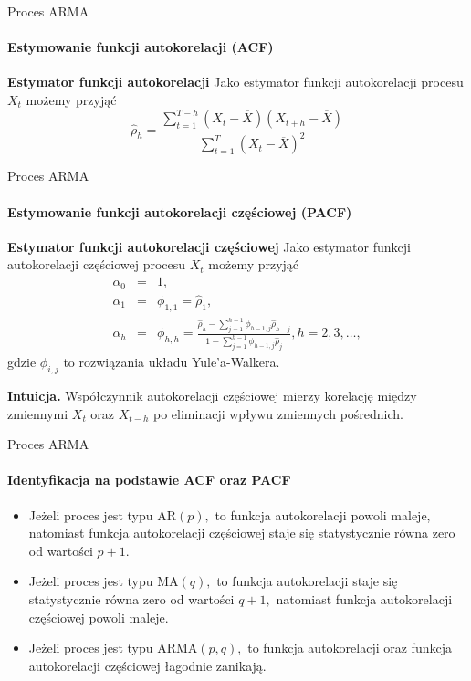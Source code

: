 \documentclass[a4paper, 11pt]{beamer}
\begin{document}
	\begin{frame}{Proces ARMA}
		\framesubtitle{Estymowanie funkcji autokorelacji (ACF)}
		\begin{block}{\textbf{Estymator funkcji autokorelacji}}
			Jako estymator funkcji autokorelacji procesu $X_t$ możemy przyjąć \[
				\hat{\rho}_h = \frac{\sum_{t=1}^{T-h}\left(X_t - \overline{X}\right)\left(X_{t+h} - \overline{X}\right)}{\sum_{t=1}^{T}\left(X_t - \overline{X}\right)^2}
			\]
		\end{block}
	\end{frame}
	
	\begin{frame}{Proces ARMA}
		\framesubtitle{Estymowanie funkcji autokorelacji częściowej (PACF)}
		\begin{block}{\textbf{Estymator funkcji autokorelacji częściowej}}
			Jako estymator funkcji autokorelacji częściowej procesu $X_t$ możemy przyjąć \begin{eqnarray*}
				\alpha_{0} & = & 1,\\
				\alpha_{1} & = & \phi_{1,1} = \hat{\rho}_1,\\
				\alpha_{h} & = & \phi_{h,h} = \frac{
					\hat{\rho}_h - \sum_{j=1}^{h-1} \phi_{h-1,j}{\hat{\rho}_{h-j}}
				}{
					1 - \sum_{j=1}^{h-1} \phi_{h-1,j} \hat{\rho}_j
				}, h = 2, 3, \ldots,
			\end{eqnarray*} gdzie $\phi_{i,j}$ to rozwiązania układu Yule'a-Walkera.
		\end{block}
		\begin{alert}{\textbf{Intuicja.}}
			Współczynnik autokorelacji częściowej mierzy korelację między zmiennymi
			$X_t$ oraz $X_{t-h}$ po eliminacji wpływu zmiennych pośrednich.
		\end{alert}
	\end{frame}
	
	\begin{frame}{Proces ARMA}
		\framesubtitle{Identyfikacja na podstawie ACF oraz PACF}
		\begin{itemize}
			\item Jeżeli proces jest typu $\mbox{AR}\left(p\right),$ to funkcja
				autokorelacji powoli maleje, natomiast funkcja autokorelacji częściowej
				staje się statystycznie równa zero od wartości $p + 1.$
			\item Jeżeli proces jest typu $\mbox{MA}\left(q\right),$ to funkcja
				autokorelacji staje się statystycznie równa zero od wartości $q + 1,$
				natomiast funkcja autokorelacji częściowej powoli maleje.
			\item Jeżeli proces jest typu $\mbox{ARMA}\left(p,q\right),$ to funkcja
				autokorelacji oraz funkcja autokorelacji częściowej łagodnie zanikają.
		\end{itemize}
	\end{frame}
	
\end{document}
